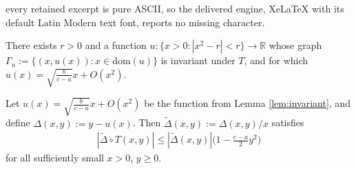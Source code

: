 \documentclass[10pt,a4paper]{amsart}
\newcommand{\RB}{\mathbb{R}}
\begin{document}
every retained excerpt is pure ASCII, so the delivered engine, XeLaTeX with its default Latin Modern text font, reports no missing character.
\begin{lemma}\label{lem:invariant}
    There exists $r>0$ and a function $u:\{x>0:|x^2-r|<r\}\rightarrow\RB$ whose graph $\Gamma_u:=\{(x,u(x)):x\in\text{dom}(u)\}$ is invariant under $T$, and for which $u(x) = \sqrt{\frac{b}{c-a}}x+O(x^2)$.
\end{lemma}

\begin{lemma}\label{lem:technical1}
    Let $u(x) = \sqrt{\frac{b}{c-a}}x+O(x^2)$ be the function from Lemma \ref{lem:invariant}, and define $\Delta(x,y):=y-u(x)$. Then $\widetilde{\Delta}(x,y):=\Delta(x,y)/x$ satisfies
    \begin{align}
        |\widetilde{\Delta}\circ T(x,y)|\leq |\widetilde{\Delta}(x,y)|\bigg(1-\frac{c-a}{2}y^2\bigg)
    \end{align}
    for all sufficiently small $x>0$, $y\geq 0$.
\end{lemma}
\end{document}
